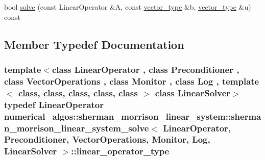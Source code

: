 \begin{DoxyCompactItemize}
\item 
bool \hyperlink{classnumerical__algos_1_1sherman__morrison__linear__system_1_1sherman__morrison__linear__system__solve_afb15a99483fe6fa811b29a04e99d132d}{solve} (const Linear\-Operator \&A, const \hyperlink{classnumerical__algos_1_1sherman__morrison__linear__system_1_1sherman__morrison__linear__system__solve_aec9272d97681f76dc772bee75ab3c3aa}{vector\-\_\-type} \&b, \hyperlink{classnumerical__algos_1_1sherman__morrison__linear__system_1_1sherman__morrison__linear__system__solve_aec9272d97681f76dc772bee75ab3c3aa}{vector\-\_\-type} \&u) const 
\end{DoxyCompactItemize}


\subsection{Member Typedef Documentation}
\hypertarget{classnumerical__algos_1_1sherman__morrison__linear__system_1_1sherman__morrison__linear__system__solve_ae0bbf19b232b98cc8b298a7909ceb0b7}{
\subsubsection[{linear\-\_\-operator\-\_\-type}]{\setlength{\rightskip}{0pt plus 5cm}template$<$class Linear\-Operator , class Preconditioner , class Vector\-Operations , class Monitor , class Log , template$<$ class, class, class, class, class $>$ class Linear\-Solver$>$ typedef Linear\-Operator {\bf numerical\-\_\-algos\-::sherman\-\_\-morrison\-\_\-linear\-\_\-system\-::sherman\-\_\-morrison\-\_\-linear\-\_\-system\-\_\-solve}$<$ Linear\-Operator, Preconditioner, Vector\-Operations, Monitor, Log, Linear\-Solver $>$\-::{\bf linear\-\_\-operator\-\_\-type}}}\label{classnumerical__algos_1_1sherman__morrison__linear__system_1_1sherman__morrison__linear__system__solve_ae0bbf19b232b98cc8b298a7909ceb0b7}

